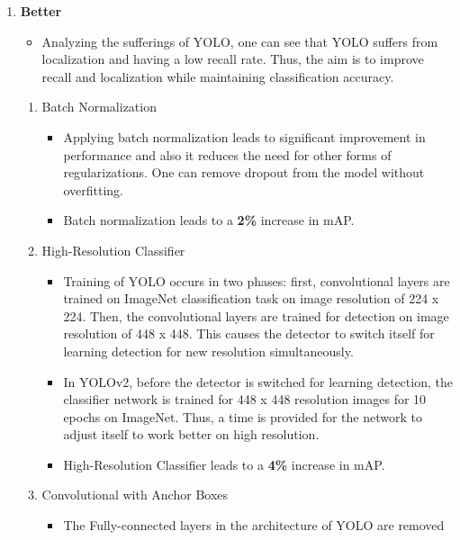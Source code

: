 \documentclass{article}
\begin{document}
\begin{enumerate}
    \item \textbf{Better}
    \begin{itemize}
        \item Analyzing the sufferings of YOLO, one can see that YOLO suffers from 
        localization and having a low recall rate. Thus, the aim is to improve 
        recall and localization while maintaining classification accuracy.
    \end{itemize}
    \begin{enumerate}
        \item Batch Normalization
        \begin{itemize}
            \item Applying batch normalization leads to significant improvement in 
            performance and also it reduces the need for other forms of 
            regularizations. One can remove dropout from the model without 
            overfitting.
            \item Batch normalization leads to a \textbf{2\%} increase in mAP.
        \end{itemize}
        \item High-Resolution Classifier
        \begin{itemize}
            \item Training of YOLO occurs in two phases: first, convolutional 
            layers are trained on ImageNet classification task on image resolution 
            of 224 x 224. Then, the convolutional layers are trained for detection 
            on image resolution of 448 x 448. This causes the detector to switch itself 
            for learning detection for new resolution simultaneously.
            \item In YOLOv2, before the detector is switched for learning detection, 
            the classifier network is trained for 448 x 448 resolution images for 10 
            epochs on ImageNet. Thus, a time is provided for the network to adjust 
            itself to work better on high resolution.
            \item High-Resolution Classifier leads to a \textbf{4\%} increase in mAP.
        \end{itemize}
        \item Convolutional with Anchor Boxes
        \begin{itemize}
            \item The Fully-connected layers in the architecture of YOLO are removed 

\end{itemize}
\end{enumerate}
\end{enumerate}
\end{document}
